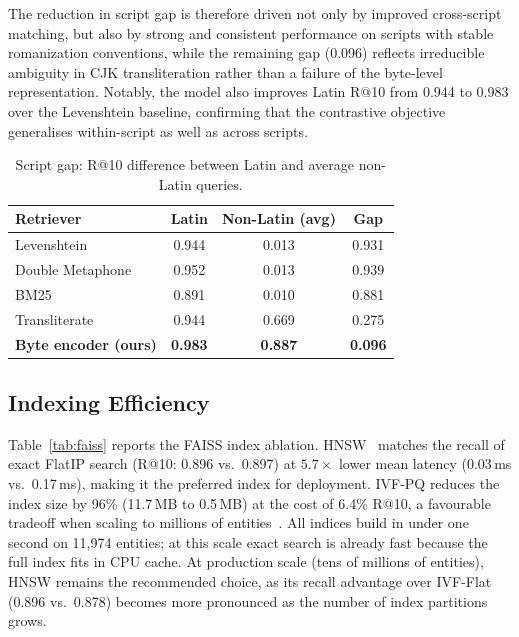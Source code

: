 \documentclass[sigconf]{acmart}
\begin{document}
The reduction in script gap is therefore driven not only by improved cross-script matching, but also by strong and consistent performance on scripts with stable romanization conventions, while the remaining gap (0.096) reflects irreducible ambiguity in CJK transliteration rather than a failure of the byte-level representation. Notably, the model also improves Latin R@10 from 0.944 to 0.983 over the Levenshtein baseline, confirming that the contrastive objective generalises within-script as well as across scripts.

\begin{table}[h]
\centering
\caption{Script gap: R@10 difference between Latin and average non-Latin queries.}
\label{tab:gap}
\begin{tabular}{lccc}
\toprule
Retriever & Latin & Non-Latin (avg) & Gap \\
\midrule
Levenshtein & 0.944 & 0.013 & 0.931 \\
Double Metaphone & 0.952 & 0.013 & 0.939 \\
BM25        & 0.891 & 0.010 & 0.881 \\
Transliterate & 0.944 & 0.669 & 0.275 \\
\textbf{Byte encoder (ours)} & \textbf{0.983} & \textbf{0.887} & \textbf{0.096} \\
\bottomrule
\end{tabular}
\end{table}

\subsection{Indexing Efficiency}

Table~\ref{tab:faiss} reports the FAISS index ablation.
HNSW~\cite{malkov2020hnsw} matches the recall of exact FlatIP search (R@10: 0.896 vs.\ 0.897)
at $5.7\times$ lower mean latency (0.03\,ms vs.\ 0.17\,ms), making it the preferred index
for deployment. IVF-PQ reduces the index size by 96\% (11.7\,MB to 0.5\,MB) at the cost of
6.4\% R@10, a favourable tradeoff when scaling to millions of entities~\cite{johnson2021faiss}.
All indices build in under one second on 11,974 entities; at this scale exact search is
already fast because the full index fits in CPU cache. At production scale (tens of millions
of entities), HNSW remains the recommended choice, as its recall advantage over IVF-Flat
(0.896 vs.\ 0.878) becomes more pronounced as the number of index partitions grows.
\end{document}
